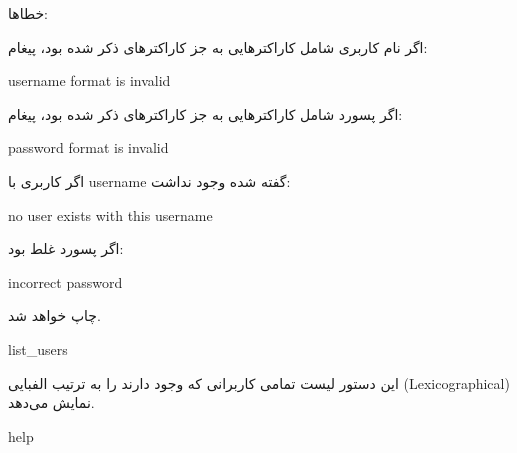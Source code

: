 \documentclass[]{article}
\begin{document}
خطاها: 

اگر نام کاربری شامل کاراکترهایی به جز کاراکترهای ذکر شده بود، پیغام:



\begin{tcolorbox}[boxrule=0pt]
	\begin{latin}
  	  \large{
  	  	username format is invalid
		}
	\end{latin}
\end{tcolorbox}

اگر پسورد شامل کاراکترهایی به جز کاراکترهای ذکر شده بود، پیغام:


\begin{tcolorbox}[boxrule=0pt]
	\begin{latin}
  	  \large{
  	  	password format is invalid
		}
	\end{latin}
\end{tcolorbox}

اگر کاربری با username گفته شده وجود نداشت:


\begin{tcolorbox}[boxrule=0pt]
	\begin{latin}
  	  \large{
  	  	no user exists with this username
		}
	\end{latin}
\end{tcolorbox}

اگر پسورد غلط بود:



\begin{tcolorbox}[boxrule=0pt]
	\begin{latin}
  	  \large{
  	  	incorrect password
		}
	\end{latin}
\end{tcolorbox}

چاپ خواهد شد.

\hrulefill




\begin{tcolorbox}[boxrule=0pt]
	\begin{latin}
  	  \large{
  	  	list\_users
		}
	\end{latin}
\end{tcolorbox}

این دستور لیست تمامی کاربرانی که وجود دارند را به ترتیب الفبایی (Lexicographical) نمایش می‌دهد.


\hrulefill



\begin{tcolorbox}[boxrule=0pt]
	\begin{latin}
  	  \large{
  	  	help
		}
	\end{latin}
\end{tcolorbox}
\end{document}
